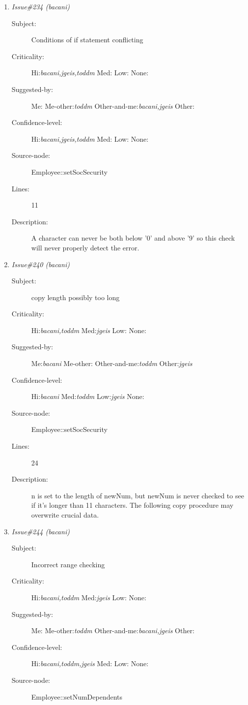 \begin{enumerate}
\begin{description}
\item [Lines:] 8

\item [Description:] In the for loop, ++i will cause the zeroth
element in the array to be skipped.
\end{description}
\item {\it Issue\#234 (bacani)}
\begin{description}
\item [Subject:] Conditions of if statement conflicting
\item [Criticality:] Hi:{\it bacani,jgeis,toddm} Med:{\it } Low:{\it } None:{\it }
\item [Suggested-by:] Me:{\it } Me-other:{\it toddm} Other-and-me:{\it bacani,jgeis} Other:{\it }
\item [Confidence-level:] Hi:{\it bacani,jgeis,toddm} Med:{\it } Low:{\it } None:{\it }
\item [Source-node:] Employee::setSocSecurity

\item [Lines:] 11

\item [Description:] A character can never be both below '0' and
above '9' so this check will never properly detect the error.
\end{description}
\item {\it Issue\#240 (bacani)}
\begin{description}
\item [Subject:] copy length possibly too long
\item [Criticality:] Hi:{\it bacani,toddm} Med:{\it jgeis} Low:{\it } None:{\it }
\item [Suggested-by:] Me:{\it bacani} Me-other:{\it } Other-and-me:{\it toddm} Other:{\it jgeis}
\item [Confidence-level:] Hi:{\it bacani} Med:{\it toddm} Low:{\it jgeis} None:{\it }
\item [Source-node:] Employee::setSocSecurity

\item [Lines:] 24

\item [Description:] n is set to the length of newNum, but newNum
is never checked to see if it's longer than 11 characters. The following copy
procedure may overwrite crucial data.
\end{description}
\item {\it Issue\#244 (bacani)}
\begin{description}
\item [Subject:] Incorrect range checking
\item [Criticality:] Hi:{\it bacani,toddm} Med:{\it jgeis} Low:{\it } None:{\it }
\item [Suggested-by:] Me:{\it } Me-other:{\it toddm} Other-and-me:{\it bacani,jgeis} Other:{\it }
\item [Confidence-level:] Hi:{\it bacani,toddm,jgeis} Med:{\it } Low:{\it } None:{\it }
\item [Source-node:] Employee::setNumDependents


\end{description}
\end{enumerate}
